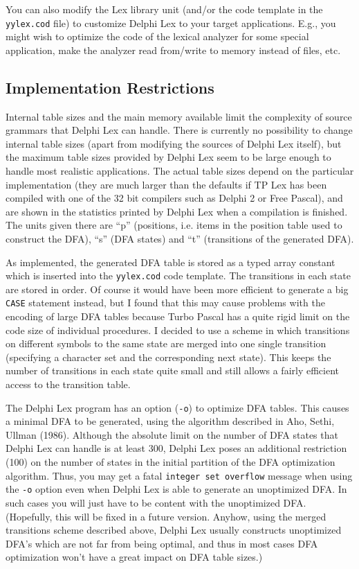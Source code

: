 \documentclass{article}
\begin{document}
You can also modify the Lex library unit (and/or the code template in the
\verb"yylex.cod" file) to customize Delphi Lex to your target applications. E.g.,
you might wish to optimize the code of the lexical analyzer for some
special application, make the analyzer read from/write to memory instead
of files, etc.

\subsection{Implementation Restrictions}

Internal table sizes and the main memory available limit the complexity of
source grammars that Delphi Lex can handle. There is currently no possibility to
change internal table sizes (apart from modifying the sources of Delphi Lex
itself), but the maximum table sizes provided by Delphi Lex seem to be large
enough to handle most realistic applications. The actual table sizes depend on
the particular implementation (they are much larger than the defaults if TP
Lex has been compiled with one of the 32 bit compilers such as Delphi 2 or
Free Pascal), and are shown in the statistics printed by Delphi Lex when a
compilation is finished. The units given there are ``p'' (positions, i.e.
items in the position table used to construct the DFA), ``s'' (DFA states) and
``t'' (transitions of the generated DFA).

As implemented, the generated DFA table is stored as a typed array constant
which is inserted into the \verb"yylex.cod" code template. The transitions in
each state are stored in order. Of course it would have been more efficient to
generate a big \verb"CASE" statement instead, but I found that this may cause
problems with the encoding of large DFA tables because Turbo Pascal has
a quite rigid limit on the code size of individual procedures. I decided to
use a scheme in which transitions on different symbols to the same state are
merged into one single transition (specifying a character set and the
corresponding next state). This keeps the number of transitions in each state
quite small and still allows a fairly efficient access to the transition
table.

The Delphi Lex program has an option (\verb"-o") to optimize DFA tables. This
causes a minimal DFA to be generated, using the algorithm described in Aho,
Sethi, Ullman (1986). Although the absolute limit on the number of DFA states
that Delphi Lex can handle is at least 300, Delphi Lex poses an additional restriction
(100) on the number of states in the initial partition of the DFA optimization
algorithm. Thus, you may get a fatal \verb"integer set overflow" message when
using the \verb"-o" option even when Delphi Lex is able to generate an unoptimized
DFA. In such cases you will just have to be content with the unoptimized DFA.
(Hopefully, this will be fixed in a future version. Anyhow, using the merged
transitions scheme described above, Delphi Lex usually constructs unoptimized
DFA's which are not far from being optimal, and thus in most cases DFA
optimization won't have a great impact on DFA table sizes.)
\end{document}
